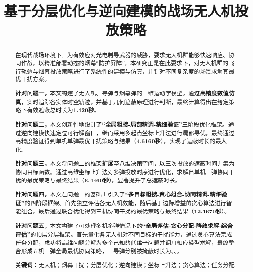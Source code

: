 \documentclass[12pt]{article}
\title{ \textbf{基于分层优化与逆向建模的战场无人机投放策略}}
\date{}
\begin{document}
	\begin{CJK}{UTF8}{gbsn}
		
		\maketitle  %
		
		\setcounter{page}{1}
		
		\vspace{-7em}
		\begin{abstract}  %
			\vspace{1em}

			\indent 在现代战场环境下，为有效应对光电制导武器的威胁，要求无人机群能够快速响应、协同作战，以精准部署动态的烟幕“防护屏障”。本研究正是在此要求下，对无人机群的飞行轨迹与烟幕投放策略进行了系统性的建模与仿真，并针对不同复杂度的场景求解其最优干扰方案。
			
			\textbf{针对问题一，}本文构建了无人机、导弹与烟幕弹的三维运动学模型。通过\textbf{高精度数值仿真}，实时追踪各实体时空轨迹，并基于几何遮蔽原理进行判断，最终计算得出在给定策略下有效遮蔽总时长为\textbf{1.420秒}。
			
			\textbf{针对问题二，}本文创新性地设计\textbf{了“全局粗搜-局部精调-精细验证”}三阶段优化框架。通过逆向建模快速定位可行解窗口，继而采用多起点坐标上升法进行局部寻优，最终通过高精度验证得到单机单弹最优干扰策略与结果（\textbf{4.6160秒}），实现了遮蔽时长的最大化。
			
			\textbf{针对问题三，}本文将问题二的框架\textbf{扩展}至八维决策空间，以三次投放的遮蔽时间并集为协同目标函数。通过高维坐标上升法对多弹投放时序进行优化，求解出单机三弹协同干扰的最优策略与最终结果（\textbf{6.4460秒}），显著提升了总遮蔽时长。
			
			\textbf{针对问题四，}本文在问题二的基础上引入了\textbf{“多目标粗搜-贪心组合-协同精调-精细验证”}的四阶段框架。首先独立评估各无人机效能，随后基于边际增益的贪心算法进行智能组合，最后通过联合优化得到三机协同干扰的最优策略与最终结果（\textbf{12.1670秒}）。
			
			\textbf{针对问题五，}本文构建了可处理多机多弹情况下的\textbf{“全局评估-贪心分配-降维求解-综合评估”}的顶层分层框架。首先量化各无人机对不同目标的干扰能力，通过贪心算法完成任务分配，成功将高维问题分解为多个已知的低维子问题并调用相应模型求解，最终整合形成五机三弹全局最优协同策略，三导弹分别被掩蔽时长为\textbf{}、\textbf{}、\textbf{}。
			
			\bigskip %
			\noindent
			\textbf{关键词：}无人机；烟幕干扰；分层优化；逆向建模；坐标上升法；贪心算法；任务分配
			

\end{abstract}
\end{CJK}
\end{document}
